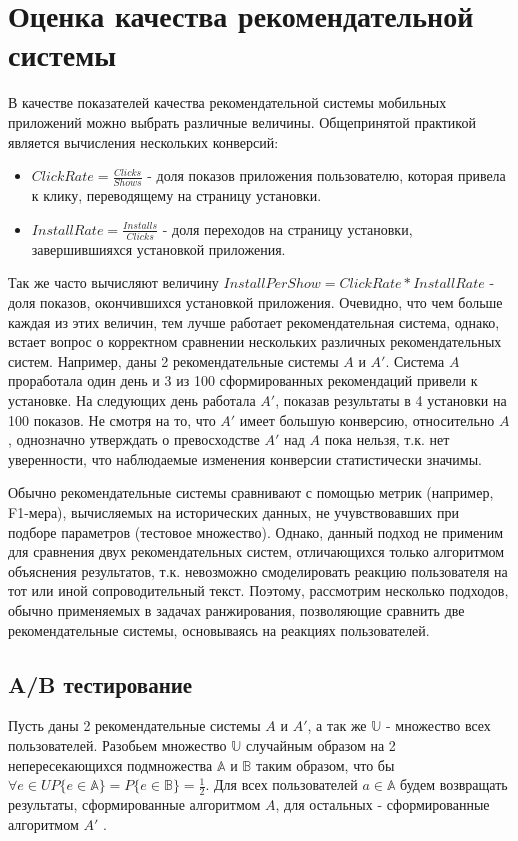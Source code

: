 \documentclass[12pt,a4paper]{report}
\begin{document}
\section{Оценка качества рекомендательной системы}
В качестве показателей качества рекомендательной системы мобильных приложений можно выбрать различные величины. Общепринятой практикой является вычисления нескольких конверсий:
\begin{itemize}
\item $ClickRate = \frac{Clicks}{Shows}$ - доля показов приложения пользователю, которая привела к клику, переводящему на страницу установки.
\item $InstallRate = \frac{Installs}{Clicks}$ - доля переходов на страницу установки, завершившияхся установкой приложения.
\end{itemize}
Так же часто вычисляют величину $InstallPerShow = ClickRate * InstallRate$ - доля показов, окончившихся установкой приложения.
Очевидно, что чем больше каждая из этих величин, тем лучше работает рекомендательная система, однако, встает вопрос о корректном сравнении нескольких различных рекомендательных систем.
Например, даны 2 рекомендательные системы $A$ и $A'$. Система $A$ проработала один день и 3 из 100 сформированных рекомендаций привели к установке. На следующих день работала $A'$, показав результаты в 4 установки на 100 показов. Не смотря на то, что $A'$ имеет большую конверсию, относительно $A$, однозначно утверждать о превосходстве $A'$ над $A$ пока нельзя, т.к. нет уверенности, что наблюдаемые изменения конверсии статистически значимы.

Обычно рекомендательные системы сравнивают с помощью метрик (например, F1-мера), вычисляемых на исторических данных, не учувствовавших при подборе параметров (тестовое множество). Однако, данный подход не применим для сравнения двух рекомендательных систем, отличающихся только алгоритмом объяснения результатов, т.к. невозможно смоделировать реакцию пользователя на тот или иной сопроводительный текст. Поэтому, рассмотрим несколько подходов, обычно применяемых в задачах ранжирования, позволяющие сравнить две рекомендательные системы, основываясь на реакциях пользователей.

\subsection{A/B тестирование}
Пусть даны 2 рекомендательные системы $A$ и $A'$, а так же $\mathbb{U}$ - множество всех пользователей. Разобьем множество $\mathbb{U}$ случайным образом на 2 непересекающихся подмножества $\mathbb{A}$ и  $\mathbb{B}$ таким образом, что бы $\forall e \in U \textit{P}\{e \in \mathbb{A}\} = \textit{P}\{e \in \mathbb{B}\} = \frac{1}{2}$.
Для всех пользователей $a \in \mathbb{A}$ будем возвращать результаты, сформированные алгоритмом $A$, для остальных - сформированные алгоритмом $A'$ \cite{Ab}.
\end{document}
